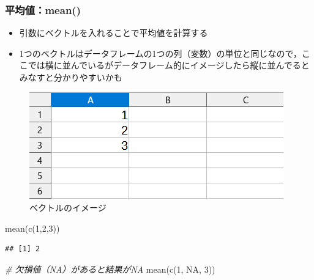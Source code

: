 \documentclass[
  xelatex,ja=standard, b5paper]{bxjsbook}
\newenvironment{Shaded}{\begin{snugshade}}{\end{snugshade}}
\newcommand{\CommentTok}[1]{\textcolor[rgb]{0.56,0.35,0.01}{\textit{#1}}}
\newcommand{\ConstantTok}[1]{\textcolor[rgb]{0.00,0.00,0.00}{#1}}
\newcommand{\DecValTok}[1]{\textcolor[rgb]{0.00,0.00,0.81}{#1}}
\newcommand{\FunctionTok}[1]{\textcolor[rgb]{0.00,0.00,0.00}{#1}}
\newcommand{\NormalTok}[1]{#1}
\providecommand{\tightlist}{%
  \setlength{\itemsep}{0pt}\setlength{\parskip}{0pt}}
\begin{document}
\hypertarget{p-function-ex-m}{%
\subsubsection{平均値：mean()}\label{p-function-ex-m}}

\begin{itemize}
\tightlist
\item
  引数にベクトルを入れることで平均値を計算する
\item
  1つのベクトルはデータフレームの1つの列（変数）の単位と同じなので，ここでは横に並んでいるがデータフレーム的にイメージしたら縦に並んでるとみなすと分かりやすいかも
\end{itemize}

\begin{figure}

{\centering \includegraphics[width=0.8\linewidth]{images/vector_image} 

}

\caption{ベクトルのイメージ}\label{fig:vectorimage}
\end{figure}

\begin{Shaded}
\begin{Highlighting}[]
\FunctionTok{mean}\NormalTok{(}\FunctionTok{c}\NormalTok{(}\DecValTok{1}\NormalTok{,}\DecValTok{2}\NormalTok{,}\DecValTok{3}\NormalTok{))}
\end{Highlighting}
\end{Shaded}

\begin{verbatim}
## [1] 2
\end{verbatim}

\begin{Shaded}
\begin{Highlighting}[]
\CommentTok{\# 欠損値（NA）があると結果がNA}
\FunctionTok{mean}\NormalTok{(}\FunctionTok{c}\NormalTok{(}\DecValTok{1}\NormalTok{, }\ConstantTok{NA}\NormalTok{, }\DecValTok{3}\NormalTok{))}
\end{Highlighting}
\end{Shaded}
\end{document}
